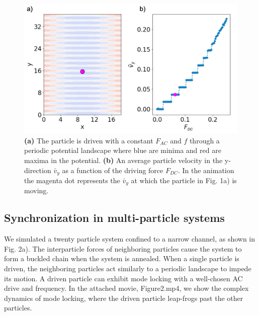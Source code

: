 \documentclass[prb,preprint]{revtex4}
\begin{document}
\begin{center}
\begin{figure}[h!]
\centering
\includegraphics[scale=.25]{single}
\caption{\textbf{(a)} The particle is driven with a constant $F_{AC}$ and $f$ through a periodic potential landscape where blue are minima and red are maxima in the potential. \textbf{(b)} An average particle velocity in the y-direction $\bar{v}_{y}$ as a function of the driving force $F_{DC}$. In the animation the magenta dot represents the $\bar{v}_{y}$ at which the particle in Fig. 1a) is moving.}
\end{figure}
\end{center}

\subsection{Synchronization in multi-particle systems}
\label{sec:sync}

We simulated a twenty particle system confined to a narrow channel, as shown in Fig. 2a). The interparticle forces of neighboring particles cause the system to form a buckled chain when the system is annealed. When a single particle is driven, the neighboring particles act similarly to a periodic landscape to impede its motion. A driven particle can exhibit mode locking with a well-chosen AC drive and frequency. In the attached movie, Figure2.mp4, we show the complex dynamics of mode locking, where the driven particle leap-frogs past the other particles. 
\end{document}
